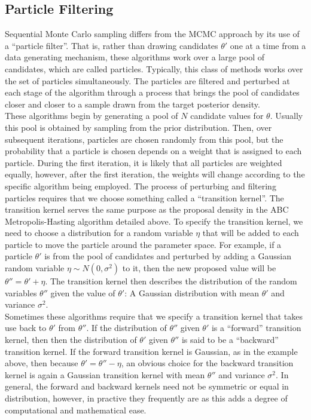 \documentclass[12pt]{article}
\begin{document}
\subsection{Particle Filtering}

Sequential Monte Carlo sampling differs from the MCMC approach by its use of a ``particle filter''. That is, rather than drawing candidates $\theta'$ one at a time from a data generating mechanism, these algorithms work over a large pool of candidates, which are called particles. Typically, this class of methods works over the set of particles simultaneously. The particles are filtered and perturbed at each stage of the algorithm through a process that brings the pool of candidates closer and closer to a sample drawn from the target posterior density. \\

These algorithms begin by generating a pool of $N$ candidate values for $\theta$. Usually this pool is obtained by sampling from the prior distribution. Then, over subsequent iterations, particles are chosen randomly from this pool, but the probability that a particle is chosen depends on a weight that is assigned to each particle. During the first iteration, it is likely that all particles are weighted equally, however, after the first iteration, the weights will change according to the specific algorithm being employed. The process of perturbing and filtering particles requires that we choose something called a ``transition kernel''. The transition kernel serves the same purpose as the proposal density in the ABC Metropolis-Hasting algorithm detailed above. To specify the transition kernel, we need to choose a distribution for a random variable $\eta$ that will be added to each particle to move the particle around the parameter space. For example, if a particle $\theta'$ is from the pool of candidates and perturbed by adding a Gaussian random variable $\eta \sim N(0, \sigma^2)$  to it, then the new proposed value will be $\theta'' = \theta ' + \eta$. The transition kernel then describes the distribution of the random variables $\theta''$ given the value of $\theta'$: A Gaussian distribution with mean $\theta'$ and variance $\sigma^2$. \\

Sometimes these algorithms require that we specify a transition kernel that takes use back to $\theta'$ from $\theta''$. If the distribution of $\theta''$ given $\theta'$ is a ``forward'' transition kernel, then then the distribution of $\theta'$ given $\theta''$ is said to be a ``backward'' transition kernel. If the forward transition kernel is Gaussian, as in the example above, then because $\theta' = \theta'' - \eta$, an obvious choice for the backward transition kernel is again a Gaussian transition kernel with mean $\theta''$ and variance $\sigma^2$. In general, the forward and backward kernels need not be symmetric or equal in distribution, however, in practive they frequently are as this adds a degree of computational and mathematical ease.  
\end{document}
